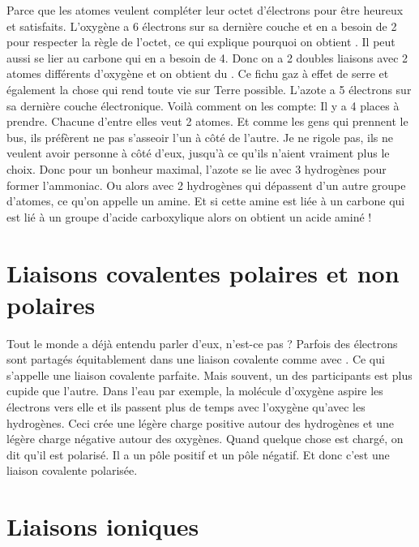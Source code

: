 Parce que les atomes veulent compléter leur octet d'électrons pour être
heureux et satisfaits. L'oxygène a 6 électrons sur sa dernière couche et
en a besoin de 2 pour respecter la règle de l'octet, ce qui explique
pourquoi on obtient . Il peut aussi se lier au
carbone qui en a besoin de 4. Donc on a 2 doubles liaisons avec 2 atomes
différents d'oxygène et on obtient du . Ce fichu gaz
à effet de serre et également la chose qui rend toute vie sur Terre
possible. L'azote a 5 électrons sur sa dernière couche électronique.
Voilà comment on les compte: Il y a 4 places à prendre. Chacune d'entre
elles veut 2 atomes. Et comme les gens qui prennent le bus, ils
préfèrent ne pas s'asseoir l'un à côté de l'autre. Je ne rigole pas, ils
ne veulent avoir personne à côté d'eux, jusqu'à ce qu'ils n'aient
vraiment plus le choix. Donc pour un bonheur maximal, l'azote se lie
avec 3 hydrogènes pour former l'ammoniac. Ou alors avec 2 hydrogènes qui
dépassent d'un autre groupe d'atomes, ce qu'on appelle un amine. Et si
cette amine est liée à un carbone qui est lié à un groupe d'acide
carboxylique alors on obtient un acide aminé !

\hypertarget{liaisons-covalentes-polaires-et-non-polaires}{%
\section{Liaisons covalentes polaires et non
polaires}\label{liaisons-covalentes-polaires-et-non-polaires}}

Tout le monde a déjà entendu parler d'eux, n'est-ce pas ? Parfois des
électrons sont partagés équitablement dans une liaison covalente comme
avec . Ce qui s'appelle une liaison covalente
parfaite. Mais souvent, un des participants est plus cupide que l'autre.
Dans l'eau par exemple, la molécule d'oxygène aspire les électrons vers
elle et ils passent plus de temps avec l'oxygène qu'avec les hydrogènes.
Ceci crée une légère charge positive autour des hydrogènes et une légère
charge négative autour des oxygènes. Quand quelque chose est chargé, on
dit qu'il est polarisé. Il a un pôle positif et un pôle négatif. Et donc
c'est une liaison covalente polarisée.

\hypertarget{liaisons-ioniques}{%
\section{Liaisons ioniques}\label{liaisons-ioniques}}

